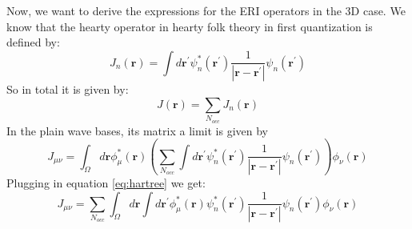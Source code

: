 \documentclass[12pt]{article}
\begin{document}
Now, we want to derive the expressions for the ERI operators in the 3D case. We know that the hearty operator in hearty folk theory in first quantization is defined by:
\begin{equation}
    J^{}_n(\mathbf{r}) = \int d\mathbf{r}^{\prime} \psi_n^{*}(\mathbf{r}^{\prime}) \frac{1}{\left|\mathbf{r} - \mathbf{r}^{\prime}\right|} \psi_n(\mathbf{r}^{\prime})
\label{eq:hartree}
\end{equation}
So in total it is given by:
\begin{equation}
    J(\mathbf{r}) = \sum_{N_{occ}} J^{}_n(\mathbf{r})
\end{equation}
In the plain wave bases, its matrix a limit is given by
\begin{equation}
    J_{\mu\nu} = \int_{\Omega } d\mathbf{r} \phi^*_\mu(\mathbf{r}) \left( \sum_{N_{occ}} \int d\mathbf{r}^{\prime} \psi_n^{*}(\mathbf{r}^{\prime}) \frac{1}{\left|\mathbf{r} - \mathbf{r}^{\prime}\right|} \psi_n(\mathbf{r} ^{\prime}) \right) \phi_\nu(\mathbf{r})
\end{equation}
Plugging in equation \ref{eq:hartree} we get:
\begin{equation}
    J_{\mu\nu} = \sum_{N_{occ}} \int_{\Omega } d\mathbf{r} \int d\mathbf{r}^{\prime} \phi^*_\mu(\mathbf{r}) \psi_n^{*}(\mathbf{r}^{\prime}) \frac{1}{\left|\mathbf{r} - \mathbf{r}^{\prime}\right|} \psi_n(\mathbf{r}^{\prime}) \phi_\nu(\mathbf{r})
\end{equation}
\end{document}
